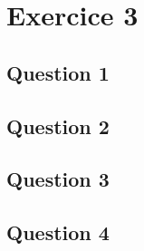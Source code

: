 \section{Exercice 3}
\subsection{Question 1}
\subsection{Question 2}
\subsection{Question 3}
\subsection{Question 4}
